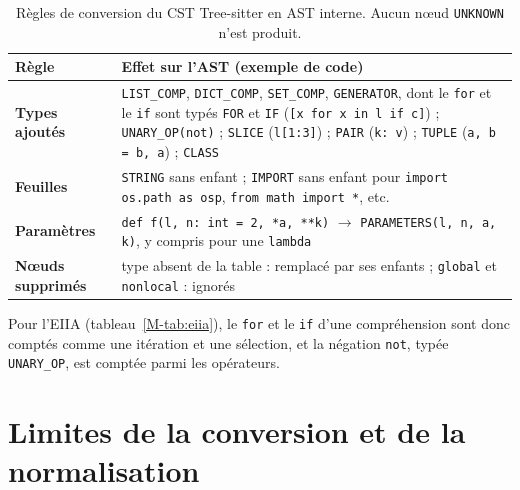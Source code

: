 \documentclass[12pt,a4paper,oneside]{report}
\begin{document}
\begin{table}[htbp]
\centering
\small
\renewcommand{\arraystretch}{1.2}
\begin{tabularx}{\textwidth}{>{\bfseries}p{3.0cm}X}
\toprule
Règle & Effet sur l'AST (exemple de code) \\
\midrule
Types ajoutés &
  \texttt{LIST\_COMP}, \texttt{DICT\_COMP}, \texttt{SET\_COMP},
  \texttt{GENERATOR}, dont le \texttt{for} et le \texttt{if} sont typés
  \texttt{FOR} et \texttt{IF} (\texttt{[x for x in l if c]}) ; \texttt{UNARY\_OP(not)} ;
  \texttt{SLICE} (\texttt{l[1:3]}) ; \texttt{PAIR} (\texttt{k: v}) ;
  \texttt{TUPLE} (\texttt{a, b = b, a}) ; \texttt{CLASS} \\
Feuilles &
  \texttt{STRING} sans enfant ;
  \texttt{IMPORT} sans enfant pour \texttt{import os.path as osp},
  \texttt{from math import *}, etc. \\
Paramètres &
  \texttt{def f(l, n: int = 2, *a, **k)} $\rightarrow$
  \texttt{PARAMETERS(l, n, a, k)}, y compris pour une \texttt{lambda} \\
Nœuds supprimés &
  type absent de la table : remplacé par ses enfants ;
  \texttt{global} et \texttt{nonlocal} : ignorés \\
\bottomrule
\end{tabularx}
\caption{Règles de conversion du CST Tree-sitter en AST interne. Aucun nœud
\texttt{UNKNOWN} n'est produit.}
\label{tab:kind_map}
\end{table}

Pour l'EIIA (tableau~\ref{M-tab:eiia}), le \texttt{for} et le \texttt{if}
d'une compréhension sont donc comptés comme une itération et une sélection,
et la négation \texttt{not}, typée \texttt{UNARY\_OP}, est comptée parmi les
opérateurs.

\section{Limites de la conversion et de la normalisation}
\label{sec:limites_ast}
\end{document}
